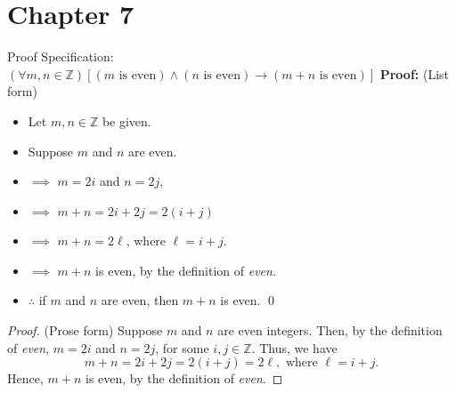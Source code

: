     \section*{Chapter 7}
\begin{Solution}{7.1}
 Proof Specification:
$(\forall m,n \in\mathbb{Z})[  (m \text{ is even}) \land (n \text{ is even}) \rightarrow (m+n \text{ is even}) ]$ \newline
\noindent\textbf{Proof:} (List form)
\begin{itemize}[noitemsep, label=$\blacktriangleright$]
    \item Let $m,n\in\mathbb{Z}$ be given. \\
    \item Suppose $m$ and $n$ are even.\\
    \item $\implies$ $m=2i$ and $n=2j$, %
    \item $\implies$  $m+n = 2i+2j = 2(i+j) $
    \item $\implies$  $m+n = 2\ell$,  where $\ell=i+j$.
    \item $\implies$ $m+n$ is even, by the definition of \textit{even}.
    \item $\therefore$ if $m$ and $n$ are even, then $m+n$ is even. \qed
\end{itemize}
\begin{proof}(Prose form)
Suppose $m$ and $n$ are even integers. Then, by the definition of \textit{even}, $m=2i$ and $n=2j$, for some $i,j\in\mathbb{Z}$.
Thus, we have
\[
 m+n = 2i + 2j = 2(i+j)= 2\ell, \text{ where $\ell=i+j$}.
\]
Hence, $m+n$ is even, by the definition of \textit{even}.
\end{proof}
\end{Solution}
